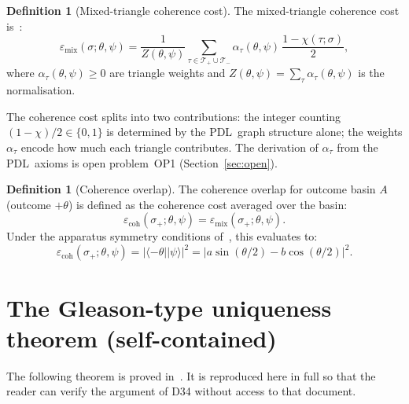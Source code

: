 \documentclass[11pt,a4paper]{article}
\theoremstyle{definition}
\newtheorem{definition}[theorem]{Definition}
\newcommand{\PDL}{\textnormal{PDL}}
\newcommand{\emix}{\varepsilon_{\mathrm{mix}}}
\newcommand{\ecoh}{\varepsilon_{\mathrm{coh}}}
\newcommand{\Tplus}{\mathcal{T}_+}
\newcommand{\Tminus}{\mathcal{T}_-}
\newcommand{\pket}[1]{|#1\rangle}
\newcommand{\pbra}[1]{\langle#1|}
\begin{document}
\begin{definition}[Mixed-triangle coherence cost]
\label{def:emix}
The mixed-triangle coherence cost is~\cite{Born_PDL_2026}:
\begin{equation}
\emix(\sigma;\theta,\psi) = \frac{1}{Z(\theta,\psi)} \sum_{\tau \in \Tplus \cup \Tminus} \alpha_\tau(\theta,\psi)\,\frac{1-\chi(\tau;\sigma)}{2},
\label{eq:emix_def}
\end{equation}
where $\alpha_\tau(\theta,\psi) \geq 0$ are triangle weights and $Z(\theta,\psi) = \sum_\tau \alpha_\tau(\theta,\psi)$ is the normalisation.
\end{definition}

The coherence cost splits into two contributions: the integer counting $(1-\chi)/2 \in \{0,1\}$ is determined by the \PDL\ graph structure alone; the weights $\alpha_\tau$ encode how much each triangle contributes. The derivation of $\alpha_\tau$ from the \PDL\ axioms is open problem~OP1 (Section~\ref{sec:open}).

\begin{definition}[Coherence overlap]
\label{def:ecoh}
The coherence overlap for outcome basin $A$ (outcome $+\theta$) is defined as the coherence cost averaged over the basin:
\begin{equation}
\ecoh(\sigma_+;\theta,\psi) = \emix(\sigma_+;\theta,\psi).
\label{eq:ecoh_def}
\end{equation}
Under the apparatus symmetry conditions of~\cite{Born_PDL_2026}, this evaluates to:
\begin{equation}
\ecoh(\sigma_+;\theta,\psi) = \bigl|\pbra{-\theta}\pket{\psi}\bigr|^2 = \bigl|a\sin(\theta/2) - b\cos(\theta/2)\bigr|^2.
\label{eq:ecoh_id}
\end{equation}
\end{definition}

\section{The Gleason-type uniqueness theorem (self-contained)}
\label{sec:gleason}

The following theorem is proved in~\cite{Gleason_PDL_2026}. It is reproduced here in full so that the reader can verify the argument of D34 without access to that document.
\end{document}
